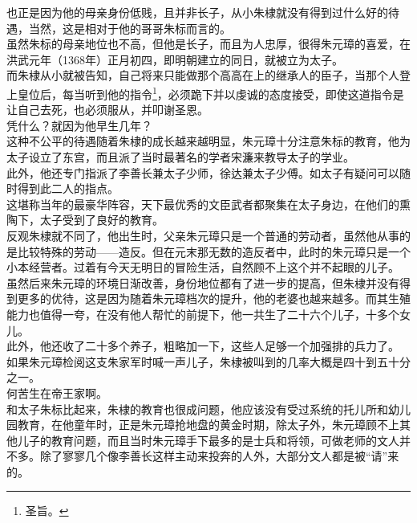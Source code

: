 \begin{multicols}{\theparacolNo}
也正是因为他的母亲身份低贱，且并非长子，从小朱棣就没有得到过什么好的待遇，当然，这是相对于他的哥哥朱标而言的。\\

虽然朱标的母亲地位也不高，但他是长子，而且为人忠厚，很得朱元璋的喜爱，在洪武元年（1368年）正月初四，即明朝建立的同日，就被立为太子。\\

而朱棣从小就被告知，自己将来只能做那个高高在上的继承人的臣子，当那个人登上皇位后，每当听到他的指令\footnote{圣旨。}，必须跪下并以虔诚的态度接受，即使这道指令是让自己去死，也必须服从，并叩谢圣恩。\\

凭什么？就因为他早生几年？\\

这种不公平的待遇随着朱棣的成长越来越明显，朱元璋十分注意朱标的教育，他为太子设立了东宫，而且派了当时最著名的学者宋濂来教导太子的学业。\\

此外，他还专门指派了李善长兼太子少师，徐达兼太子少傅。如太子有疑问可以随时得到此二人的指点。\\

这堪称当年的最豪华阵容，天下最优秀的文臣武者都聚集在太子身边，在他们的熏陶下，太子受到了良好的教育。\\

反观朱棣就不同了，他出生时，父亲朱元璋只是一个普通的劳动者，虽然他从事的是比较特殊的劳动——造反。但在元末那无数的造反者中，此时的朱元璋只是一个小本经营者。过着有今天无明日的冒险生活，自然顾不上这个并不起眼的儿子。\\

虽然后来朱元璋的环境日渐改善，身份地位都有了进一步的提高，但朱棣并没有得到更多的优待，这是因为随着朱元璋档次的提升，他的老婆也越来越多。而其生殖能力也值得一夸，在没有他人帮忙的前提下，他一共生了二十六个儿子，十多个女儿。\\

此外，他还收了二十多个养子，粗略加一下，这些人足够一个加强排的兵力了。\\

如果朱元璋检阅这支朱家军时喊一声儿子，朱棣被叫到的几率大概是四十到五十分之一。\\

何苦生在帝王家啊。\\

和太子朱标比起来，朱棣的教育也很成问题，他应该没有受过系统的托儿所和幼儿园教育，在他童年时，正是朱元璋抢地盘的黄金时期，除太子外，朱元璋顾不上其他儿子的教育问题，而且当时朱元璋手下最多的是士兵和将领，可做老师的文人并不多。除了寥寥几个像李善长这样主动来投奔的人外，大部分文人都是被“请”来的。\\


\end{multicols}
